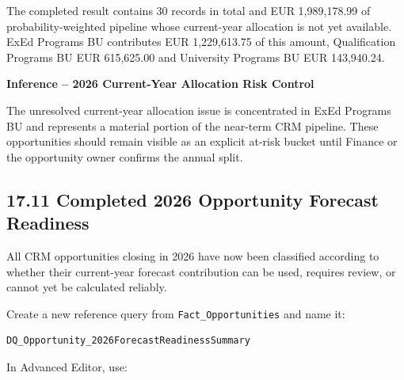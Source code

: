 \documentclass[11pt,a4paper]{article}
\begin{document}
The completed result contains 30 records in total and EUR 1,989,178.99 of
probability-weighted pipeline whose current-year allocation is not yet available.
ExEd Programs BU contributes EUR 1,229,613.75 of this amount, Qualification
Programs BU EUR 615,625.00 and University Programs BU EUR 143,940.24.

\begin{inferencebox}

\textbf{Inference -- 2026 Current-Year Allocation Risk Control}

The unresolved current-year allocation issue is concentrated in ExEd Programs
BU and represents a material portion of the near-term CRM pipeline. These
opportunities should remain visible as an explicit at-risk bucket until Finance
or the opportunity owner confirms the annual split.

\end{inferencebox}

\subsection{17.11 Completed 2026 Opportunity Forecast Readiness}

All CRM opportunities closing in 2026 have now been classified according to
whether their current-year forecast contribution can be used, requires review,
or cannot yet be calculated reliably.

Create a new reference query from \texttt{Fact\_Opportunities} and name it:

\begin{lstlisting}[style=powerquery]
DQ_Opportunity_2026ForecastReadinessSummary
\end{lstlisting}

In Advanced Editor, use:
\end{document}

